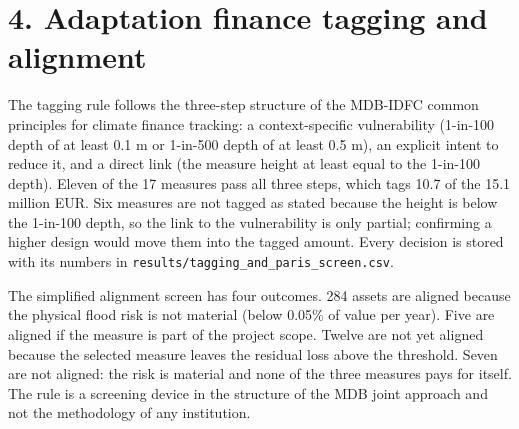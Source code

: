 \documentclass[11pt,a4paper]{article}
\begin{document}
\section*{4. Adaptation finance tagging and alignment}
The tagging rule follows the three-step structure of the MDB-IDFC common principles for climate finance tracking: a context-specific vulnerability (1-in-100 depth of at least 0.1 m or 1-in-500 depth of at least 0.5 m), an explicit intent to reduce it, and a direct link (the measure height at least equal to the 1-in-100 depth). Eleven of the 17 measures pass all three steps, which tags 10.7 of the 15.1 million EUR. Six measures are not tagged as stated because the height is below the 1-in-100 depth, so the link to the vulnerability is only partial; confirming a higher design would move them into the tagged amount. Every decision is stored with its numbers in \texttt{results/tagging\_and\_paris\_screen.csv}.

The simplified alignment screen has four outcomes. 284 assets are aligned because the physical flood risk is not material (below 0.05\% of value per year). Five are aligned if the measure is part of the project scope. Twelve are not yet aligned because the selected measure leaves the residual loss above the threshold. Seven are not aligned: the risk is material and none of the three measures pays for itself. The rule is a screening device in the structure of the MDB joint approach and not the methodology of any institution.
\end{document}
